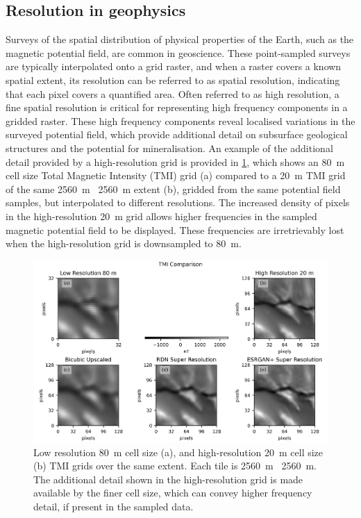 \documentclass[manuscript.tex]{subfiles}
\begin{document}
\subsection{Resolution in geophysics}
\label{sec:resingeo}
Surveys of the spatial distribution of physical properties of the Earth, such as the magnetic potential field, are common in geoscience.
These point-sampled surveys are typically interpolated onto a grid raster, and when a raster covers a known spatial extent, its resolution can be referred to as spatial resolution, indicating that each pixel covers a quantified area.
Often referred to as high resolution, a fine spatial resolution is critical for representing high frequency components in a gridded raster.
These high frequency components reveal localised variations in the surveyed potential field, which provide additional detail on subsurface geological structures and the potential for mineralisation.
An example of the additional detail provided by a high-resolution grid is provided in \cref{fig:lrandhr}, which shows an \SI{80}{\metre} cell size Total Magnetic Intensity (TMI) grid (a) compared to a \SI{20}{\metre} TMI grid of the same \SI{2560}{\metre} \texttimes\ \SI{2560}{\metre} extent (b), gridded from the same potential field samples, but interpolated to different resolutions.
The increased density of pixels in the high-resolution \SI{20}{\metre} grid allows higher frequencies in the sampled magnetic potential field to be displayed.
These frequencies are irretrievably lost when the high-resolution grid is downsampled to \SI{80}{\metre}.

\begin{figure}[hbt]
    \includegraphics[width=\linewidth]{fig/p1/image1.png}
    \caption[Comparison of different resolution grids]{Low resolution \SI{80}{\metre} cell size (a), and high-resolution \SI{20}{\metre} cell size (b) TMI grids over the same extent.
        Each tile is \SI{2560}{\metre} \texttimes\ \SI{2560}{\metre}.
        The additional detail shown in the high-resolution grid is made available by the finer cell size, which can convey higher frequency detail, if present in the sampled data.}
    \label{fig:lrandhr}
\end{figure}
\end{document}

